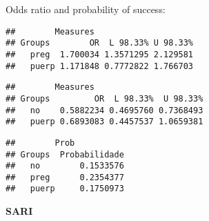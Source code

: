\documentclass[
]{article}
\newenvironment{Shaded}{\begin{snugshade}}{\end{snugshade}}
\newcommand{\CommentTok}[1]{\textcolor[rgb]{0.56,0.35,0.01}{\textit{#1}}}
\newcommand{\KeywordTok}[1]{\textcolor[rgb]{0.13,0.29,0.53}{\textbf{#1}}}
\newcommand{\NormalTok}[1]{#1}
\newcommand{\OperatorTok}[1]{\textcolor[rgb]{0.81,0.36,0.00}{\textbf{#1}}}
\begin{document}
Odds ratio and probability of success:

\begin{Shaded}
\end{Shaded}

\begin{verbatim}
##        Measures
## Groups        OR  L 98.33% U 98.33%
##   preg  1.700034 1.3571295 2.129581
##   puerp 1.171848 0.7772822 1.766703
\end{verbatim}

\begin{Shaded}
\end{Shaded}

\begin{verbatim}
##        Measures
## Groups         OR  L 98.33%  U 98.33%
##   no    0.5882234 0.4695760 0.7368493
##   puerp 0.6893083 0.4457537 1.0659381
\end{verbatim}

\begin{Shaded}
\end{Shaded}

\begin{verbatim}
##        Prob
## Groups  Probabilidade
##   no        0.1533576
##   preg      0.2354377
##   puerp     0.1750973
\end{verbatim}

\textbf{SARI}
\end{document}

